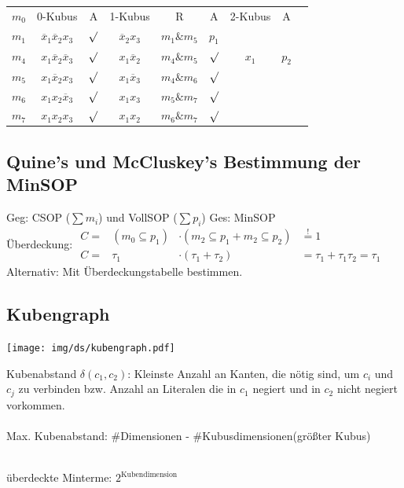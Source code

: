 \documentclass[6pt,a4paper]{scrartcl}
\begin{document}
\begin{multicols}{3}
\begin{tabular}{l | c | c  || c | c | c || c | c | r}
$m_0$ & 0-Kubus & A & 1-Kubus & R & A & 2-Kubus  & A \\
$m_1$ & $\overline x_1 \overline x_2 x_3$ & $\surd$ & $\overline x_2 x_3$ & $m_1 \& m_5$ & $p_1$ & &\\
$m_4$ & $x_1 \overline x_2 \overline x_3$ & $\surd$ & $x_1 \overline x_2$ & $m_4 \& m_5$ & $\surd$ & $x_1$ &   $p_2$\\
$m_5$ & $x_1 \overline x_2  x_3$ & $\surd$  & $x_1 \overline x_3$ & $m_4 \& m_6$ & $\surd$& &\\
$m_6$ & $x_1 x_2 \overline x_3$ & $ \surd$ & $x_1 x_3$ & $ m_5 \& m_7$ & $ \surd$ & &\\
$m_7$ & $x_1 x_2 x_3$ & $\surd$ & $x_1 x_2$ & $m_6 \& m_7 $ & $ \surd$ & &\\
\end{tabular}

	\subsection{Quine's und McCluskey's Bestimmung der MinSOP}
	Geg: CSOP ($\sum m_i$) und VollSOP ($\sum p_i$) \qquad Ges: MinSOP\\
	Überdeckung: $\begin{array}{rccl} C = & (m_0 \subseteq p_1) & \cdot (m_2 \subseteq p_1 + m_2 \subseteq p_2) & \stackrel{!}=1 \\ C = & \tau_1 & \cdot (\tau_1 + \tau_2) & = \tau_1 + \tau_1 \tau_2 = \tau_1 \end{array}$ \\
	Alternativ: Mit Überdeckungstabelle bestimmen.

	\subsection{Kubengraph}
	\parbox{3.0cm}{\texttt{[image: img/ds/kubengraph.pdf]} }
	\parbox{6.0cm}{Kubenabstand $\delta(c_1, c_2)$: Kleinste Anzahl an Kanten, die nötig sind, um $c_i$ und $c_j$ zu verbinden bzw.
	Anzahl an Literalen die in $c_1$ negiert und in $c_2$ nicht negiert vorkommen.\\
	
	\\
	Max. Kubenabstand: \#Dimensionen - \#Kubusdimensionen(größter Kubus) \\
	} \\
	überdeckte Minterme: $2^{\text{Kubendimension}}$

\end{multicols}
\end{document}
